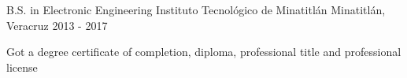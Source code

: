 


\begin{cventries}


\cventry
{B.S. in Electronic Engineering} %
{Instituto Tecnológico de Minatitlán} %
{Minatitlán, Veracruz} %
{2013 - 2017} %
{ %
\begin{cvitems}
\item {Got a degree certificate of completion, diploma, professional title and professional license }
\end{cvitems}
}


\end{cventries}